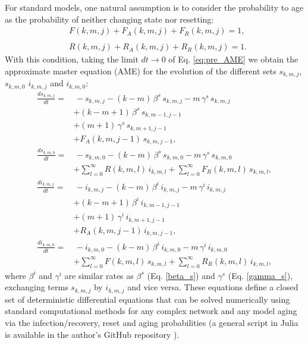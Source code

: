 For standard models, one natural assumption is to consider the probability to age as the probability of neither changing state nor resetting:
\begin{align} \label{cond_1}
    &  F (k,m,j) + F_{A}(k,m,j) + F_{R}(k,m,j) = 1, \nonumber\\
    \\
    &  R (k,m,j) + R_{A}(k,m,j) + R_{R}(k,m,j) = 1. \nonumber
    \end{align}
    With this condition, taking the limit $dt \to 0$ of Eq. \eqref{eq:pre_AME} we obtain the approximate master equation (AME) for the evolution of the different sets $s_{k,m,j}$, $s_{k,m,0}$ $i_{k,m,j}$ and $i_{k,m,0}$:
    \begin{align}
    \label{eq:AME}
        \frac{d s_{k,m,j}}{dt} = & \, - s_{k,m,j} - (k - m)\, \beta^s\,  s_{k,m,j} - m \, \gamma^s\, s_{k,m,j} \nonumber \\
        & + (k-m+1)\, \beta^s \,   s_{k,m-1,j-1} \nonumber\\
        & + (m+1)\, \gamma^s \,  s_{k,m+1,j-1}\nonumber\\
        & + F_{A}(k,m,j-1)\,  s_{k,m,j-1},  \nonumber\\
        \frac{d s_{k,m,0}}{dt}  = & \, - s_{k,m,0} - (k - m) \, \beta^s\,  s_{k,m,0} - m\, \gamma^s \,  s_{k,m,0} \nonumber \\
        & + \sum_{l = 0}^{\infty} R (k,m,l)\,  i_{k,m,l} + \sum_{l = 0}^{\infty} F_{R}(k,m,l)\, s_{k,m,l}, \nonumber \\
         \frac{d i_{k,m,j}}{dt}  = & \, - i_{k,m,j} - (k - m)\, \beta^i\,  i_{k,m,j} - m\, \gamma^i \,   i_{k,m,j} \nonumber\\
        & + (k-m+1)\, \beta^i\,    i_{k,m-1,j-1} \nonumber\\
        & + (m+1)\, \gamma^i \,   i_{k,m+1,j-1} \\
        & + R_{A}(k,m,j-1) \, i_{k,m,j-1},  \nonumber\\
         \frac{d i_{k,m,0}}{dt}  = & \,  - i_{k,m,0} - (k - m) \, \beta^i\,  i_{k,m,0} - m\,  \gamma^i \,  i_{k,m,0} \nonumber\\
        & + \sum_{l = 0}^{\infty} F(k,m,l) \, s_{k,m,l} + \sum_{l = 0}^{\infty} R_{R}(k,m,l) \, i_{k,m,l}, \nonumber
    \end{align}
    where $\beta^i$ and $\gamma^i$ are similar rates as $\beta^s$ (Eq. \eqref{beta_s}) and $\gamma^s$ (Eq. \eqref{gamma_s}), exchanging terms $s_{k,m,j}$ by $i_{k,m,j}$ and vice versa. These equations define a closed set of deterministic differential equations that can be solved numerically using standard computational methods for any complex network and any model aging via the infection/recovery, reset and aging probabilities (a general script in Julia is available in the author's GitHub repository \cite{link_git}).
    
